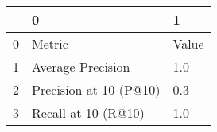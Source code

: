\begin{tabular}{lll}
\toprule
{} &                       0 &      1 \\
\midrule
0 &                  Metric &  Value \\
1 &       Average Precision &    1.0 \\
2 &  Precision at 10 (P@10) &    0.3 \\
3 &     Recall at 10 (R@10) &    1.0 \\
\bottomrule
\end{tabular}
